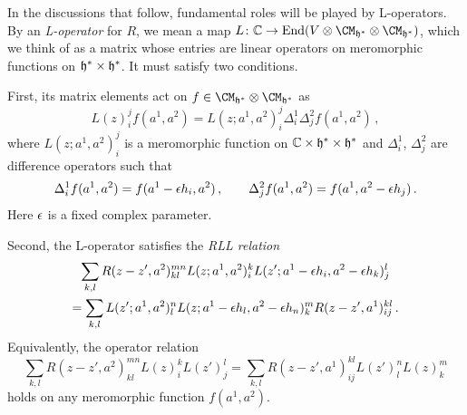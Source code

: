 In the discussions that follow, fundamental roles will be played by
L-operators.  By an \emph{L-operator} for $R$, we mean a map
$L\colon \C \to \End(V \otimes \CM_{\hf^*} \otimes
\CM_{\hf^*})$, which we think of as a matrix whose entries are
linear operators on meromorphic functions on
$\mathfrak{h}^* \times \mathfrak{h}^*$.  It must satisfy two conditions.

First, its matrix elements act on
$f \in \CM_{\hf^*} \otimes \CM_{\hf^*}$ as
\begin{equation}
  L(z)^j_i f(a^1,a^2)
  = L(z;a^1,a^2)^j_i \Delta_i^1 \Delta_j^2 f(a^1,a^2) \,,
\end{equation}
where $L(z;a^1,a^2)^j_i$ is a meromorphic function on
$\mathbb{C} \times \mathfrak{h}^* \times \mathfrak{h}^*$ and $\Delta_i^1$,
$\Delta_j^2$ are difference operators such that
\begin{equation}
  \Delta_i^1 f(a^1,a^2)
  = f(a^1 - \epsilon h_i,a^2) \,,
  \qquad
  \Delta_j^2 f(a^1,a^2)
  = f(a^1, a^2 - \epsilon h_j) \,.
\end{equation}
Here $\epsilon$ is a fixed complex parameter.

Second, the L-operator satisfies the \emph{RLL relation}
\begin{multline}
  \label{eq:RLL}
  \sum_{k,l}
  R(z-z', a^2)^{mn}_{kl}
  L(z;a^1,a^2)^k_i
  L(z'; a^1 - \epsilon h_i, a^2 - \epsilon h_k)^l_j
  \\
  =
  \sum_{k,l}
  L(z';a^1,a^2)^n_l
  L(z; a^1 - \epsilon h_l, a^2 - \epsilon h_n)^m_k
  R(z-z', a^1)^{kl}_{ij} \,.
\end{multline}
Equivalently, the operator relation
\begin{equation}
  \sum_{k,l}
  R(z-z', a^2)^{mn}_{kl} L(z)^k_i L(z')^l_j
  =
  \sum_{k,l}
  R(z-z', a^1)^{kl}_{ij} L(z')^n_l L(z)^m_k
\end{equation}
holds on any meromorphic function $f(a^1, a^2)$.

